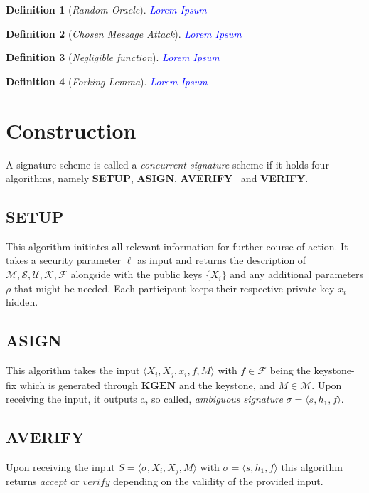 \documentclass[final]{IEEEtran}%
\newcommand{\goedel}[1]{\langle #1 \rangle}
\newcommand{\mespace}{\mathcal{M}}
\newcommand{\sspace}{\mathcal{S}}
\newcommand{\uspace}{\mathcal{U}}
\newcommand{\kspace}{\mathcal{K}}
\newcommand{\kfspace}{\mathcal{F}}
\newtheorem{definition}{\bfseries Definition}
\begin{document}
  \begin{definition}[\textnormal{\textit{Random Oracle}}]
    \textcolor{blue}{Lorem Ipsum}
  \end{definition}

  \begin{definition}[\textnormal{\textit{Chosen Message Attack}}]
    \textcolor{blue}{Lorem Ipsum}
  \end{definition}

  \begin{definition}[\textnormal{\textit{Negligible function}}]
    \textcolor{blue}{Lorem Ipsum}
  \end{definition}

  \begin{definition}[\textnormal{\textit{Forking Lemma}}]
    \textcolor{blue}{Lorem Ipsum}
  \end{definition}


\section{Construction}
  A signature scheme is called a \textit{concurrent signature} scheme if it holds four algorithms, namely \textbf{SETUP}, \textbf{ASIGN}, \textbf{AVERIFY}~ and \textbf{VERIFY}.
   
  \subsection{\textbf{SETUP}}
    This algorithm initiates all relevant information for further course of action.
    It takes a security parameter \(\ell\) as input and returns the description of \(\mespace, \sspace, \uspace, \kspace, \kfspace\) alongside with the public keys \(\{X_i\}\) and any additional parameters \(\rho\) that might be needed.
    Each participant keeps their respective private key \(x_i\) hidden. 

  \subsection{\textbf{ASIGN}}
    This algorithm takes the input \(\goedel{X_i, X_j, x_i, f, M}\) with \(f\in\kfspace\) being the keystone-fix which is generated through \(\textbf{KGEN}\) and the keystone, and \(M\in\mespace\).
    Upon receiving the input, it outputs a, so called, \textit{ambiguous signature} \(\sigma=\goedel{s, h_1, f}\).

  \subsection{\textbf{AVERIFY}}
    Upon receiving the input \(S = \goedel{\sigma, X_i, X_j, M}\) with \(\sigma=\goedel{s,h_1, f}\) this algorithm returns \(accept\) or \(verify\) depending on the validity of the provided input.
  
\end{document}
